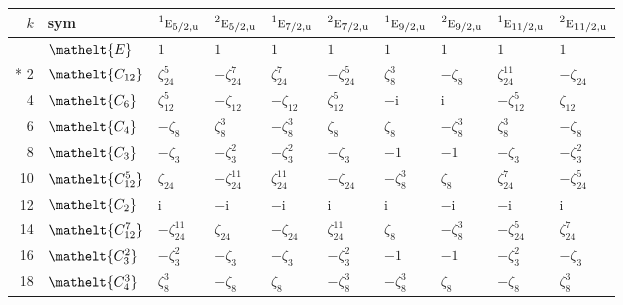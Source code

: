 \documentclass[10pt,a4paper]{article}
\numberwithin{equation}{section}
\newcommand{\eltfont}[1]{{\let\sigma\eltsigma\mathelt{#1}}}
\newcommand{\irr}[1]{\text{\normalfont\scshape #1}}
\newcommand{\conjpair}[1]{{}^{#1}}
\newcommand{\cls}[1]{\eltfont{#1}}
\newcommand{\ptag}[1]{\mathrm{#1}}
\newcommand{\iunit}{\mathrm{i}}
\newcommand{\rootunity}[1]{\zeta_{#1}}
\begin{document}
{\small\setlength{\tabcolsep}{4pt}
\begin{longtable}{@{}rlllllllll@{}}\toprule
$k$ & sym & $\conjpair{1}\irr{e}_{5/2,\ptag{u}}$ & $\conjpair{2}\irr{e}_{5/2,\ptag{u}}$ & $\conjpair{1}\irr{e}_{7/2,\ptag{u}}$ & $\conjpair{2}\irr{e}_{7/2,\ptag{u}}$ & $\conjpair{1}\irr{e}_{9/2,\ptag{u}}$ & $\conjpair{2}\irr{e}_{9/2,\ptag{u}}$ & $\conjpair{1}\irr{e}_{11/2,\ptag{u}}$ & $\conjpair{2}\irr{e}_{11/2,\ptag{u}}$\\\midrule\endhead
\bottomrule\endfoot\endlastfoot
0 & $\cls{E}$ & $1$ & $1$ & $1$ & $1$ & $1$ & $1$ & $1$ & $1$\\*
2 & $\cls{C_{12}}$ & $\rootunity{24}^{5}$ & $-\rootunity{24}^{7}$ & $\rootunity{24}^{7}$ & $-\rootunity{24}^{5}$ & $\rootunity{8}^{3}$ & $-\rootunity{8}$ & $\rootunity{24}^{11}$ & $-\rootunity{24}$\\
4 & $\cls{C_{6}}$ & $\rootunity{12}^{5}$ & $-\rootunity{12}$ & $-\rootunity{12}$ & $\rootunity{12}^{5}$ & $-\iunit{}$ & $\iunit{}$ & $-\rootunity{12}^{5}$ & $\rootunity{12}$\\
6 & $\cls{C_{4}}$ & $-\rootunity{8}$ & $\rootunity{8}^{3}$ & $-\rootunity{8}^{3}$ & $\rootunity{8}$ & $\rootunity{8}$ & $-\rootunity{8}^{3}$ & $\rootunity{8}^{3}$ & $-\rootunity{8}$\\
8 & $\cls{C_{3}}$ & $-\rootunity{3}$ & $-\rootunity{3}^{2}$ & $-\rootunity{3}^{2}$ & $-\rootunity{3}$ & $-1$ & $-1$ & $-\rootunity{3}$ & $-\rootunity{3}^{2}$\\
10 & $\cls{C_{12}^{5}}$ & $\rootunity{24}$ & $-\rootunity{24}^{11}$ & $\rootunity{24}^{11}$ & $-\rootunity{24}$ & $-\rootunity{8}^{3}$ & $\rootunity{8}$ & $\rootunity{24}^{7}$ & $-\rootunity{24}^{5}$\\
12 & $\cls{C_{2}}$ & $\iunit{}$ & $-\iunit{}$ & $-\iunit{}$ & $\iunit{}$ & $\iunit{}$ & $-\iunit{}$ & $-\iunit{}$ & $\iunit{}$\\
14 & $\cls{C_{12}^{7}}$ & $-\rootunity{24}^{11}$ & $\rootunity{24}$ & $-\rootunity{24}$ & $\rootunity{24}^{11}$ & $\rootunity{8}$ & $-\rootunity{8}^{3}$ & $-\rootunity{24}^{5}$ & $\rootunity{24}^{7}$\\
16 & $\cls{C_{3}^{2}}$ & $-\rootunity{3}^{2}$ & $-\rootunity{3}$ & $-\rootunity{3}$ & $-\rootunity{3}^{2}$ & $-1$ & $-1$ & $-\rootunity{3}^{2}$ & $-\rootunity{3}$\\
18 & $\cls{C_{4}^{3}}$ & $\rootunity{8}^{3}$ & $-\rootunity{8}$ & $\rootunity{8}$ & $-\rootunity{8}^{3}$ & $-\rootunity{8}^{3}$ & $\rootunity{8}$ & $-\rootunity{8}$ & $\rootunity{8}^{3}$\\

\end{longtable}}
\end{document}
